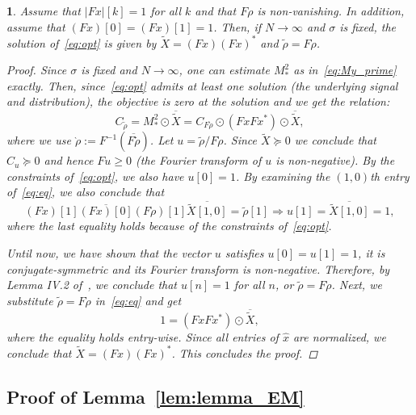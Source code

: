 \documentclass{IEEEtran}
\numberwithin{equation}{section}
\numberwithin{figure}{section}
\theoremstyle{plain}
\newtheorem{thm}{\protect\theoremname}[section]
\theoremstyle{definition}
\theoremstyle{remark}
\theoremstyle{plain}
\theoremstyle{remark}
\theoremstyle{plain}
\theoremstyle{plain}
\theoremstyle{remark}
\providecommand{\theoremname}{Theorem}
\newcommand{\F}{F}
\begin{document}
\begin{thm} \label{thm:sdp}
    Assume that $\vert \F x\vert [k]=1$ for all $k$ and that $\F\rho$ is non-vanishing. In addition, assume that $(\F x)[0] = (\F x)[1]=1$.
    Then, if $N\to\infty$ and $\sigma$ is fixed, the solution of~\eqref{eq:opt} is given by $\tilde{X} = (\F x) (\F x)^* $ and $\tilde{\rho} =  \F \grave\rho$.  
    \begin{proof}

Since $\sigma$ is fixed and $N\to\infty$, one can estimate $M^2_\ast$ as in~\eqref{eq:My_prime}  exactly.
    Then, since~\eqref{eq:opt} admits at least one solution (the underlying signal and distribution), the objective is zero at the solution and we get the relation:
\begin{equation} \label{eq:eq} 
C_{\tilde{\rho}} = M^2_\ast \odot\overline{\tilde{X}}  =  C_{\F \grave\rho}\odot(\F x\F x^*) \odot\overline{\tilde{X}}, 
\end{equation}
where we use $\grave\rho :=\F ^{-1}(\overline{\F \tilde{\rho}}) $. 
Let $u = \tilde{\rho}/\F \grave\rho$. Since $\tilde{X}\succeq 0$ we conclude that 
$C_{u}\succeq 0$ and hence $\F u\geq 0$ (the Fourier transform of $u$ is non-negative). By the constraints of~\eqref{eq:opt}, we also have $u[0]=1$. By examining the $(1,0)$th entry of~\eqref{eq:eq}, we also conclude that
\begin{equation*}
(\F x)[1]\overline{(\F x)[0]}(\F \grave\rho)[1] \overline{\tilde{X}[1,0]} = \tilde{\rho}[1] \Rightarrow u[1] = \overline{\tilde{X}[1,0]} = 1, 
\end{equation*}
where the last equality holds because of the constraints of~\eqref{eq:opt}.

Until now, we have shown that the vector $u$ satisfies $u[0]=u[1]=1$, it is conjugate-symmetric and its Fourier transform is non-negative. Therefore, by Lemma IV.2 of~\cite{bendory2017bispectrum}, we conclude that $u [n]= 1$ for all $n$, or $\tilde{\rho} = \F \grave\rho$. 
Next, we substitute $\tilde{\rho} = \F \grave\rho$ in~\eqref{eq:eq} and get 
\begin{equation*} 
1   = (\F x\F x^*) \odot\overline{\tilde{X}},
\end{equation*}
where the equality holds entry-wise.
Since all entries of $\hat{x}$ are normalized, we conclude that $\tilde{X}= (\F x) (\F x)^*$. This concludes the proof.
\end{proof}
\end{thm}

\subsection{Proof of Lemma~\ref{lem:lemma_EM}} \label{sec:proof_lemma_EM}
\end{document}
